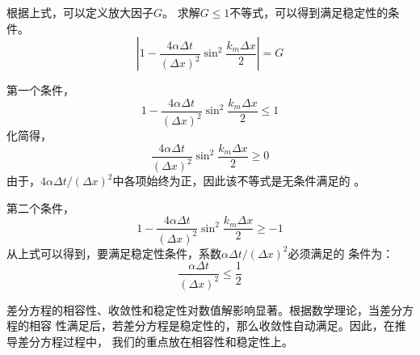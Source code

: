 根据上式，可以定义放大因子$G$。
求解$G\le 1$不等式，可以得到满足稳定性的条件。
\begin{equation}
\left|
1
-
\frac{4\alpha \Delta t}{(\Delta x)^{2}}
\sin^{2}\frac{k_{m}\Delta x}{2}
\right|
=
G
\end{equation}

第一个条件，
\begin{equation}
1
-
\frac{4\alpha \Delta t}{(\Delta x)^{2}}
\sin^{2}\frac{k_{m}\Delta x}{2}
\le 1
\end{equation}
化简得，
\begin{equation}
\frac{4\alpha \Delta t}{(\Delta x)^{2}}
\sin^{2}\frac{k_{m}\Delta x}{2}
\ge
0
\end{equation}
由于，$4\alpha\Delta t/(\Delta x)^{2}$中各项始终为正，因此该不等式是无条件满足的
。

第二个条件，
\begin{equation}
1
-
\frac{4\alpha \Delta t}{(\Delta x)^{2}}
\sin^{2}\frac{k_{m}\Delta x}{2}
\ge -1
\end{equation}
从上式可以得到，要满足稳定性条件，系数$\alpha\Delta t/(\Delta x)^{2}$必须满足的
条件为：
\begin{equation}
\frac{\alpha \Delta t}{(\Delta x)^{2}}
\le
\frac{1}{2}
\end{equation}

差分方程的相容性、收敛性和稳定性对数值解影响显著。根据数学理论，当差分方程的相容
性满足后，若差分方程是稳定性的，那么收敛性自动满足。因此，在推导差分方程过程中，
我们的重点放在相容性和稳定性上。
